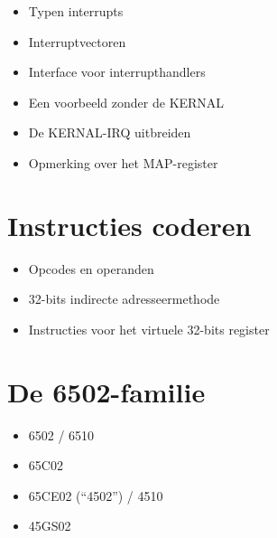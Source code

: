 \begin{itemize}
    \item Typen interrupts\item Interruptvectoren\item Interface voor interrupthandlers\item Een voorbeeld zonder de KERNAL\item De KERNAL-IRQ uitbreiden\item Opmerking over het MAP-register
\end{itemize}

\section{Instructies coderen}

\begin{itemize}
    \item Opcodes en operanden\item 32-bits indirecte adresseermethode\item Instructies voor het virtuele 32-bits register
\end{itemize}

\section{De 6502-familie}

\begin{itemize}
    \item 6502 / 6510\item 65C02\item 65CE02 (``4502'') / 4510\item 45GS02
\end{itemize}
